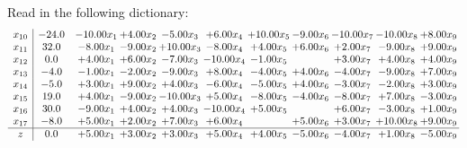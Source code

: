 \documentclass[9pt]{article}
\begin{document}
Read in the following dictionary:
\[\begin{array}{c| c c@{\hskip 2pt} c@{\hskip 2pt} c@{\hskip 2pt} c@{\hskip 2pt} c@{\hskip 2pt} c@{\hskip 2pt} c@{\hskip 2pt} c@{\hskip 2pt} c@{\hskip 2pt} }
 x_{10}   &  -24.0 & -10.00 x_{1} & +  4.00 x_{2} & -5.00 x_{3} & +  6.00 x_{4} & + 10.00 x_{5} & -9.00 x_{6} & -10.00 x_{7} & -10.00 x_{8} & +  8.00 x_{9}\\
 x_{11}   &  32.0 & -8.00 x_{1} & -9.00 x_{2} & + 10.00 x_{3} & -8.00 x_{4} & +  4.00 x_{5} & +  6.00 x_{6} & +  2.00 x_{7} & -9.00 x_{8} & +  9.00 x_{9}\\
 x_{12}   &  0.0 & +  4.00 x_{1} & +  6.00 x_{2} & -7.00 x_{3} & -10.00 x_{4} & -1.00 x_{5} &   & +  3.00 x_{7} & +  4.00 x_{8} & +  4.00 x_{9}\\
 x_{13}   &  -4.0 & -1.00 x_{1} & -2.00 x_{2} & -9.00 x_{3} & +  8.00 x_{4} & -4.00 x_{5} & +  4.00 x_{6} & -4.00 x_{7} & -9.00 x_{8} & +  7.00 x_{9}\\
 x_{14}   &  -5.0 & +  3.00 x_{1} & +  9.00 x_{2} & +  4.00 x_{3} & -6.00 x_{4} & -5.00 x_{5} & +  4.00 x_{6} & -3.00 x_{7} & -2.00 x_{8} & +  3.00 x_{9}\\
 x_{15}   &  19.0 & +  4.00 x_{1} & -9.00 x_{2} & -10.00 x_{3} & +  5.00 x_{4} & -8.00 x_{5} & -4.00 x_{6} & -8.00 x_{7} & +  7.00 x_{8} & -3.00 x_{9}\\
 x_{16}   &  30.0 & -9.00 x_{1} & +  4.00 x_{2} & +  4.00 x_{3} & -10.00 x_{4} & +  5.00 x_{5} &   & +  6.00 x_{7} & -3.00 x_{8} & +  1.00 x_{9}\\
 x_{17}   &  -8.0 & +  5.00 x_{1} & +  2.00 x_{2} & +  7.00 x_{3} & +  6.00 x_{4} &   & +  5.00 x_{6} & +  3.00 x_{7} & + 10.00 x_{8} & +  9.00 x_{9}\\
\hline
z    &  0.0 & +  5.00 x_{1} & +  3.00 x_{2} & +  3.00 x_{3} & +  5.00 x_{4} & +  4.00 x_{5} & -5.00 x_{6} & -4.00 x_{7} & +  1.00 x_{8} & -5.00 x_{9}\\
\end{array}\]
\end{document}
